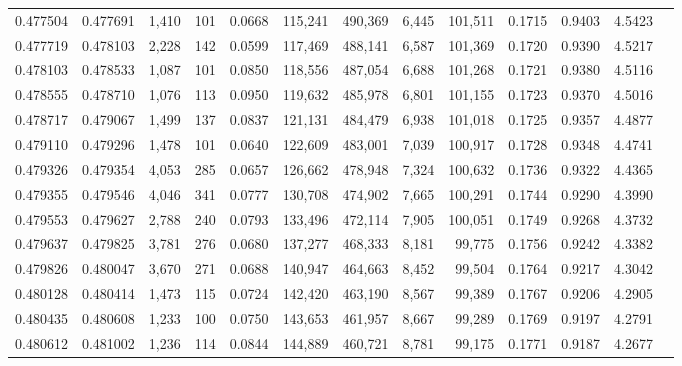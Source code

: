 \begin{tabular}{rrrrrrrrrrrrr}
0.477504 & 0.477691 & 1,410 &   101 &                                     0.0668 & 115,241 & 490,369 &   6,445 & 101,511 & 0.1715 & 0.9403 & 4.5423 \\
0.477719 & 0.478103 & 2,228 &   142 &                                     0.0599 & 117,469 & 488,141 &   6,587 & 101,369 & 0.1720 & 0.9390 & 4.5217 \\
0.478103 & 0.478533 & 1,087 &   101 &                                     0.0850 & 118,556 & 487,054 &   6,688 & 101,268 & 0.1721 & 0.9380 & 4.5116 \\
0.478555 & 0.478710 & 1,076 &   113 &                                     0.0950 & 119,632 & 485,978 &   6,801 & 101,155 & 0.1723 & 0.9370 & 4.5016 \\
0.478717 & 0.479067 & 1,499 &   137 &                                     0.0837 & 121,131 & 484,479 &   6,938 & 101,018 & 0.1725 & 0.9357 & 4.4877 \\
0.479110 & 0.479296 & 1,478 &   101 &                                     0.0640 & 122,609 & 483,001 &   7,039 & 100,917 & 0.1728 & 0.9348 & 4.4741 \\
0.479326 & 0.479354 & 4,053 &   285 &                                     0.0657 & 126,662 & 478,948 &   7,324 & 100,632 & 0.1736 & 0.9322 & 4.4365 \\
0.479355 & 0.479546 & 4,046 &   341 &                                     0.0777 & 130,708 & 474,902 &   7,665 & 100,291 & 0.1744 & 0.9290 & 4.3990 \\
0.479553 & 0.479627 & 2,788 &   240 &                                     0.0793 & 133,496 & 472,114 &   7,905 & 100,051 & 0.1749 & 0.9268 & 4.3732 \\
0.479637 & 0.479825 & 3,781 &   276 &                                     0.0680 & 137,277 & 468,333 &   8,181 &  99,775 & 0.1756 & 0.9242 & 4.3382 \\
0.479826 & 0.480047 & 3,670 &   271 &                                     0.0688 & 140,947 & 464,663 &   8,452 &  99,504 & 0.1764 & 0.9217 & 4.3042 \\
0.480128 & 0.480414 & 1,473 &   115 &                                     0.0724 & 142,420 & 463,190 &   8,567 &  99,389 & 0.1767 & 0.9206 & 4.2905 \\
0.480435 & 0.480608 & 1,233 &   100 &                                     0.0750 & 143,653 & 461,957 &   8,667 &  99,289 & 0.1769 & 0.9197 & 4.2791 \\
0.480612 & 0.481002 & 1,236 &   114 &                                     0.0844 & 144,889 & 460,721 &   8,781 &  99,175 & 0.1771 & 0.9187 & 4.2677 \\

\end{tabular}
